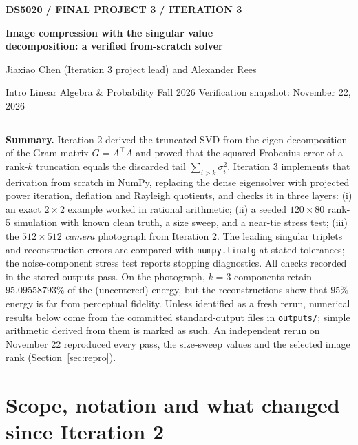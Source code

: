 \documentclass[11pt,letterpaper]{article}
\numberwithin{equation}{section}
\newcommand{\fn}[1]{\texttt{#1}}
\begin{document}
{\sffamily\small\bfseries\color{accent} DS5020 \quad / \quad FINAL PROJECT 3 \quad / \quad ITERATION 3}\par\smallskip
{\huge\bfseries\color{ink} Image compression with the singular value\\[3pt] decomposition: a verified from-scratch solver}\par\medskip
{\large Jiaxiao Chen \textnormal{(Iteration 3 project lead)} \enspace and \enspace Alexander Rees}\par
Intro Linear Algebra \& Probability \hfill Fall 2026 \hfill Verification snapshot: November 22, 2026
\medskip\hrule\medskip

\noindent\textbf{Summary.}
Iteration 2 derived the truncated SVD from the eigen-decomposition of the Gram matrix $G=A^\top A$ and proved that the squared Frobenius error of a rank-$k$ truncation equals the discarded tail $\sum_{i>k}\sigma_i^2$.
Iteration 3 implements that derivation from scratch in NumPy, replacing the dense eigensolver with projected power iteration, deflation and Rayleigh quotients, and checks it in three layers:
(i) an exact $2\times2$ example worked in rational arithmetic;
(ii) a seeded $120\times80$ rank-5 simulation with known clean truth, a size sweep, and a near-tie stress test;
(iii) the $512\times512$ \emph{camera} photograph from Iteration 2.
The leading singular triplets and reconstruction errors are compared with \fn{numpy.linalg} at stated tolerances; the noise-component stress test reports stopping diagnostics.
All checks recorded in the stored outputs pass. On the photograph, $k=3$ components retain $95.09558793\%$ of the (uncentered) energy, but the reconstructions show that $95\%$ energy is far from perceptual fidelity.
Unless identified as a fresh rerun, numerical results below come from the committed standard-output files in \texttt{outputs/}; simple arithmetic derived from them is marked as such. An independent rerun on November 22 reproduced every pass, the size-sweep values and the selected image rank (Section~\ref{sec:repro}).

\section{Scope, notation and what changed since Iteration 2}
\end{document}

